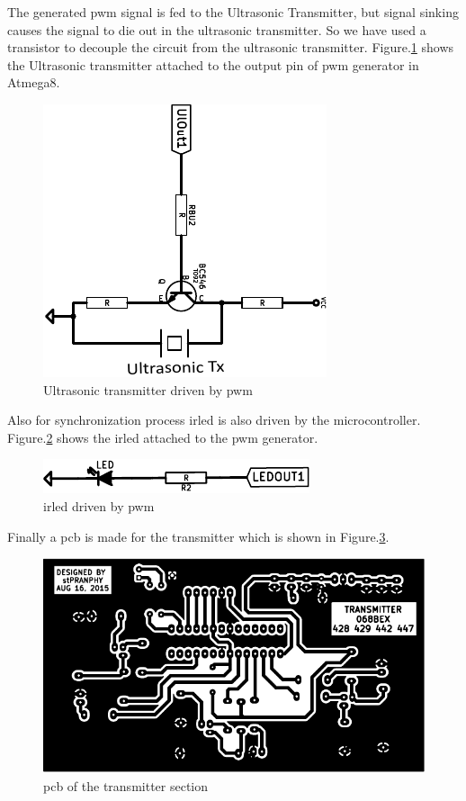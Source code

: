 The generated \gls{pwm} signal is fed to the Ultrasonic Transmitter, but signal sinking causes the signal to die out in the ultrasonic transmitter. So we have used a transistor to decouple the circuit from the ultrasonic transmitter. Figure.\ref{fig:Transmitter} shows the Ultrasonic transmitter attached to the output pin of \gls{pwm} generator in Atmega8.
\begin{figure}
	\centering
	\includegraphics{Images/Transmitter.pdf}
	\caption{Ultrasonic transmitter driven by \gls{pwm}}
	\label{fig:Transmitter}
\end{figure}

Also for synchronization process \gls{irled} is also driven by the microcontroller. Figure.\ref{fig:IRLEDCircuit} shows the \gls{irled} attached to the \gls{pwm} generator.

\begin{figure}
	\centering
	\includegraphics{Images/IRLEDCircuit.pdf}
	\caption{\gls{irled} driven by \gls{pwm}}
	\label{fig:IRLEDCircuit}
\end{figure}

Finally a \gls{pcb} is made for the transmitter which is shown in Figure.\ref{fig:TransmitterPCB}.

\begin{figure}
	\centering
	\includegraphics{Images/TransmitterPCB.pdf}
	\caption{\gls{pcb} of the transmitter section}
	\label{fig:TransmitterPCB}
\end{figure}


